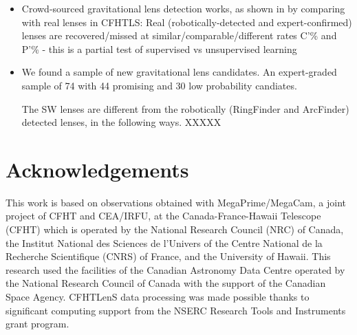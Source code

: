 \documentclass[useAMS,usenatbib,a4paper]{mn2e}
\begin{document}
\begin{itemize} 

\item Crowd-sourced gravitational lens detection works, as shown in by comparing with real lenses in CFHTLS:
Real (robotically-detected and expert-confirmed) lenses are
recovered/missed at similar/comparable/different rates C’\% and P’\% - this is a partial test of supervised vs unsupervised learning


\item We found a sample of new gravitational lens candidates. An
expert-graded sample of 74 with 44 promising and 30 low probability
candiates.

The SW lenses are different from the robotically (RingFinder and ArcFinder) detected lenses, in the following ways.
XXXXX


\end{itemize}



\section*{Acknowledgements}
 

This work is based on observations obtained with MegaPrime/MegaCam, a joint
project of CFHT and CEA/IRFU, at the Canada-France-Hawaii Telescope (CFHT) which
is operated by the National Research Council (NRC) of Canada, the Institut
National des Sciences de l'Univers of the Centre National de la Recherche
Scientifique (CNRS) of France, and the University of Hawaii. This research used
the facilities of the Canadian Astronomy Data Centre operated by the National
Research Council of Canada with the support of the Canadian Space Agency.
CFHTLenS data processing was made possible thanks to significant computing
support from the NSERC Research Tools and Instruments grant program.


\appendix




% 



%



\label{lastpage}
\bsp
\end{document}
